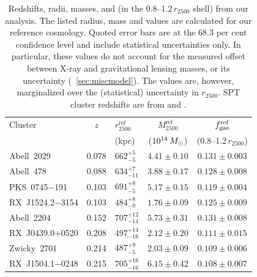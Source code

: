 \begin{table}
  \centering
  \caption{
    Redshifts, radii, masses, and \fgas{} (in the 0.8--1.2\,$r_{2500}$ shell) from our analysis. The listed radius, mass and \fgas{} values are calculated for our reference \LCDM{} cosmology. Quoted error bars are at the 68.3 per cent confidence level and include statistical uncertainties only. In particular, these values do not account for the measured offset between X-ray and gravitational lensing masses, or its uncertainty (\secref~\ref{sec:miscmodel}). The \fgas{} values are, however, marginalized over the (statistical) uncertainty in $r_{2500}$. SPT cluster redshifts are from \citet{Reichardt1203.5775} and \citet{McDonald1208.2962}.
  }
  \label{tab:fgas}
  \begin{tabular}{lclcc}
    \hline
    Cluster & $z$ & $r_{2500}^\mathrm{ref}$ & $M_{2500}^\mathrm{ref}$ & $f_{\mathrm{gas}} ^\mathrm{ref}$ \\
    & & (kpc) & ($10^{14}\, M_{\odot}$) & (0.8--1.2\,$r_{2500}$) \\ 
    \hline 
    Abell~2029           &  0.078  &  $662^{+5}_{-5}$    &                $4.41\pm0.10$   &  $0.131\pm0.003$\vspace{0.5ex}\\
    Abell~478            &  0.088  &  $634^{+7}_{-11}$   &                $3.88\pm0.17$   &  $0.128\pm0.008$\vspace{0.5ex}\\
    PKS~0745$-$191       &  0.103  &  $691^{+8}_{-5}$    &                $5.17\pm0.15$   &  $0.119\pm0.004$\vspace{0.5ex}\\
    RX~J1524.2$-$3154    &  0.103  &  $484^{+8}_{-9}$    &                $1.76\pm0.09$   &  $0.125\pm0.009$\vspace{0.5ex}\\
    Abell~2204           &  0.152  &  $707^{+12}_{-14}$  &                $5.73\pm0.31$   &  $0.131\pm0.008$\vspace{0.5ex}\\
    RX~J0439.0+0520      &  0.208  &  $497^{+14}_{-16}$  &                $2.12\pm0.20$   &  $0.111\pm0.015$\vspace{0.5ex}\\
    Zwicky~2701          &  0.214  &  $487^{+9}_{-5}$    &                $2.03\pm0.09$   &  $0.109\pm0.006$\vspace{0.5ex}\\
    RX~J1504.1$-$0248    &  0.215  &  $705^{+16}_{-16}$  &                $6.15\pm0.42$   &  $0.108\pm0.007$\vspace{0.5ex}\\

\end{tabular}
\end{table}
